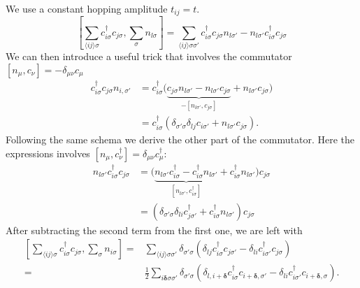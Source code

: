 \documentclass[../main.tex]{subfile}
\begin{document}
 We use a constant hopping amplitude $t_{ij} = t$.
\[
    \left[ \sum_{\langle ij\rangle\sigma} c_{i\sigma}^{\dagger}c_{j\sigma} , \sum_{\sigma} n_{l\sigma}\right] 
    = \sum_{\langle ij\rangle\sigma\sigma'}  c_{i\sigma}^{\dagger}c_{j\sigma}n_{l\sigma'} - n_{l\sigma'}c_{i\sigma}^{\dagger}c_{j\sigma}
\]
We can then introduce a useful trick that involves the commutator $[n_{\mu},c_{\nu}] = -\delta_{\mu\nu}c_{\mu}$
\begin{equation*}
    \begin{aligned}
    c_{i\sigma}^{\dagger}c_{j\sigma}n_{i,\sigma'} &= c_{i\sigma}^{\dagger} \bigl( \underbrace{c_{j\sigma}n_{l\sigma'} 
    -n_{l\sigma'}c_{j\sigma}}_{-[n_{l\sigma'},c_{j\sigma}]} + n_{l\sigma'}c_{j\sigma}\bigr) \\
    & = c_{i\sigma}^{\dagger} \left(\delta_{\sigma'\sigma}\delta_{lj}c_{i\sigma'} + n_{l\sigma'}c_{j\sigma}\right).
    \end{aligned}
\end{equation*}
Following the same schema we derive the other part of the commutator. Here the expressions involves
$[n_{\mu}, c^{\dagger}_{\nu}] = \delta_{\mu\nu}c^{\dagger}_{\mu}$:
\begin{equation*}
    \begin{aligned}
        n_{l\sigma'}c_{i\sigma}^{\dagger}c_{j\sigma} &= \bigl( \underbrace{n_{l\sigma'}c_{i\sigma}^{\dagger} 
        - c_{i\sigma}^{\dagger}n_{l\sigma'}}_{[n_{l\sigma'}, c^{\dagger}_{i\sigma}]} + c_{i\sigma}^{\dagger}n_{l\sigma'} \bigr)c_{j\sigma} \\
        &= \left(\delta_{\sigma'\sigma}\delta_{li}c_{j\sigma'}^{\dagger} + c_{i\sigma}^{\dagger}n_{l\sigma'} \right)c_{j\sigma}
    \end{aligned}
\end{equation*}
After subtracting the second term from the first one, we are left with
\begin{equation*}
    \begin{aligned}
    \left[ \sum_{\langle ij\rangle\sigma} c_{i\sigma}^{\dagger}c_{j\sigma} , \sum_{\sigma} n_{i\sigma}\right] 
    =&\sum_{\langle ij\rangle\sigma\sigma'} \delta_{\sigma'\sigma} \left( \delta_{lj}c_{i\sigma}^{\dagger} c_{j\sigma'} - \delta_{li}c_{i\sigma'}^{\dagger}c_{j\sigma}\right)\\
    =& \frac{1}{2}\sum_{ i \bm{\delta}\sigma\sigma'} \delta_{\sigma'\sigma} \left( \delta_{l,i+ \bm{\delta}}c_{i\sigma}^{\dagger}
     c_{i+ \bm{\delta},\sigma'} - \delta_{li}c_{i\sigma'}^{\dagger}c_{i+ \bm{\delta},\sigma}\right).
\end{aligned}
\end{equation*}
\end{document}
